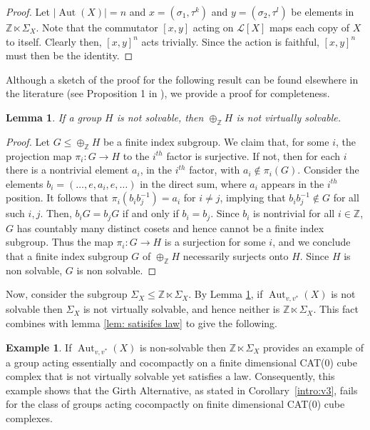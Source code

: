 \documentclass{amsart}
\newtheorem{lemma}[theorem]{Lemma}
\theoremstyle{definition}
\newtheorem{example}[theorem]{Example}
\newtheorem*{Notation warning}{Warning on notations}
\newtheorem*{Sketch of proof}{Sketch of proof for Theorem C}
\def\aut{\mathop{\mathrm{Aut}}\nolimits}
\begin{document}
\begin{sloppypar}
\begin{proof}
     Let $|\aut(X)|=n$ and $x=(\sigma_1,\tau^k)$ and $y=(\sigma_2,\tau^l)$ be elements in $\mathbb{Z}\ltimes\Sigma_X$. Note that the commutator $[x,y]$ acting on $\mathcal{L}[X]$ maps each copy of $X$ to itself. Clearly then, $[x,y]^{n}$ acts trivially. Since the action is faithful, $[x,y]^{n}$ must then be the identity.
\end{proof}

Although a sketch of the proof for the following result can be found elsewhere in the literature (see Proposition 1 in \cite{dyubina2000instability}), we provide a proof for completeness. 

\begin{lemma}\label{lem:direct sum not virt solv}
    If a group $H$ is not solvable, then $\oplus_\mathbb{Z}H$ is not virtually solvable.
\end{lemma}
\begin{proof}
    Let $G\leq\oplus_\mathbb{Z}H$ be a finite index subgroup. We claim that, for some $i$, the projection map $\pi_i:G\rightarrow H$ to the $i^{th}$ factor is surjective. If not, then for each $i$ there is a nontrivial element $a_i$, in the $i^{th}$ factor, with $a_i\notin \pi_i(G)$. Consider the elements $b_i=(\ldots,e, a_i,e,\ldots)$ in the direct sum, where $a_i$ appears in the $i^{th}$ position. It follows that $\pi_i(b_ib_j^{-1})=a_i$ for $i\neq j$, implying that $b_ib_j^{-1}\notin G$ for all such $i,j$. Then, $b_iG=b_jG$ if and only if $b_i=b_j$. Since $b_i$ is nontrivial for all $i\in\mathbb{Z}$, $G$ has countably many distinct cosets and hence cannot be a finite index subgroup. Thus the map $\pi_i:G\rightarrow H$ is a surjection for some $i$, and we conclude that a finite index subgroup $G$ of $\oplus_\mathbb{Z}H$ necessarily surjects onto $H$. Since $H$ is non solvable, $G$ is non solvable.
\end{proof}
Now, consider the subgroup $\Sigma_X\le\mathbb{Z}\ltimes\Sigma_X$. By Lemma \ref{lem:direct sum not virt solv}, if $\aut_{v,v^*}(X)$ is not solvable then $\Sigma_X$ is not virtually solvable, and hence neither is $\mathbb{Z}\ltimes\Sigma_X$. This fact combines with lemma \ref{lem: satisifes law} to give the following.


\begin{example}
    If $\aut_{v,v^*}(X)$ is non-solvable then $\mathbb{Z}\ltimes\Sigma_X$ provides an example of a group acting essentially and cocompactly on a finite dimensional CAT(0) cube complex that is not virtually solvable yet satisfies a law. Consequently, this example shows that the Girth Alternative, as stated in Corollary~\ref{intro:v3}, fails for the class of groups acting cocompactly on finite dimensional CAT(0) cube complexes.
    \medskip


\end{example}
\end{sloppypar}
\end{document}
